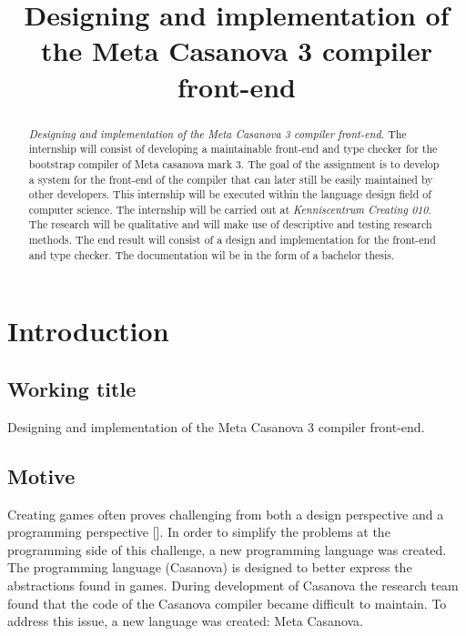 



\title{Designing and implementation of the Meta Casanova 3 compiler front-end}
\author{\writer}

\begin{titlepage}
   
\end{titlepage}

\begin{abstract}
   \emph{Designing and implementation of the Meta Casanova 3 compiler front-end.}
   The internship will consist of developing a maintainable front-end and type checker for the bootstrap compiler of Meta casanova mark 3.
   The goal of the assignment is to develop a system for the front-end of the compiler that can later still be easily maintained by other developers.
   This internship will be executed within the language design field of computer science.
   The internship will be carried out at \emph{Kenniscentrum Creating 010}.
   The research will be qualitative and will make use of descriptive and testing research methods.
   The end result will consist of a design and implementation for the front-end and type checker. 
   The documentation wil be in the form of a bachelor thesis.
\end{abstract}

\section{Introduction}
\subsection{Working title}
Designing and implementation of the Meta Casanova 3 compiler front-end.

\subsection{Motive}

Creating games often proves challenging from both a design perspective and a programming perspective []. 
In order to simplify the problems at the programming side of this challenge, a new programming language was created. 
The programming language (Casanova) is designed to better express the abstractions found in games. 
During development of Casanova the research team found that the code of the Casanova compiler became difficult to maintain. 
To address this issue, a new language was created: Meta Casanova.

